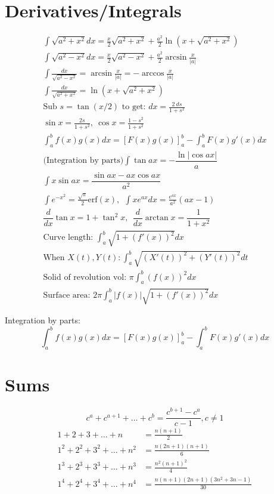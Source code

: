 \section{Derivatives/Integrals}
\begin{align*}
	\int \sqrt{a^2+x^2} dx = \frac{x}{2}\sqrt{a^2+x^2} + \frac{a^2}{2}\ln (x+\sqrt{a^2+x^2})\\
	\int \sqrt{a^2-x^2} dx = \frac{x}{2}\sqrt{a^2-x^2} + \frac{a^2}{2}\arcsin\frac{x}{|a|}\\
	\int \frac{dx}{\sqrt{a^2-x^2}} = \arcsin\frac{x}{|a|} = -\arccos\frac{x}{|a|}\\
	\int \frac{dx}{\sqrt{a^2+x^2}} = \ln (x+\sqrt{a^2+x^2})\\
	\text{Sub } s = \tan(x/2) \text{ to get: } dx =  \frac{2\ ds}{1+s^2}\\
	\sin x = \frac{2s}{1+s^2},\ \cos x = \frac{1-s^2}{1+s^2}\\
	\int_a^bf(x)g(x)dx = [F(x)g(x)]_a^b-\int_a^bF(x)g'(x)dx\\
	\text{(Integration by parts)} \int\tan ax = -\dfrac{\ln|\cos ax|}{a}\\
	\int x\sin ax = \dfrac{\sin ax-ax \cos ax}{a^2}\\
	\int e^{-x^2} = \frac{\sqrt \pi}{2} \text{erf}(x), \ \ \int xe^{ax}dx = \frac{e^{ax}}{a^2}(ax-1)\\
	\dfrac{d}{dx}\tan x = 1+\tan^2x, \ \  \dfrac{d}{dx}\arctan x = \dfrac{1}{1+x^2}\\
	\text{Curve length: } \int_a^b\sqrt{1+(f'(x))^2}dx\\
	\text{When } X(t), Y(t): \int_a^b\sqrt{(X'(t))^2+(Y'(t))^2}dt\\
	\text{Solid of revolution vol: } \pi\int_a^b(f(x))^2dx\\
	\text{Surface area: } 2\pi\int_a^b|f(x)|\sqrt{1+(f'(x))^2}dx
\end{align*}

Integration by parts:
\[\int_a^bf(x)g(x)dx = [F(x)g(x)]_a^b-\int_a^bF(x)g'(x)dx\]

\section{Sums}
\[ c^a + c^{a+1} + \dots + c^{b} = \frac{c^{b+1} - c^a}{c-1}, c \neq 1 \]
\begin{align*}
	1 + 2 + 3 + \dots + n &= \frac{n(n+1)}{2} \\
	1^2 + 2^2 + 3^2 + \dots + n^2 &= \frac{n(2n+1)(n+1)}{6} \\
	1^3 + 2^3 + 3^3 + \dots + n^3 &= \frac{n^2(n+1)^2}{4} \\
	1^4 + 2^4 + 3^4 + \dots + n^4 &= \frac{n(n+1)(2n+1)(3n^2 + 3n - 1)}{30} \\
\end{align*}

